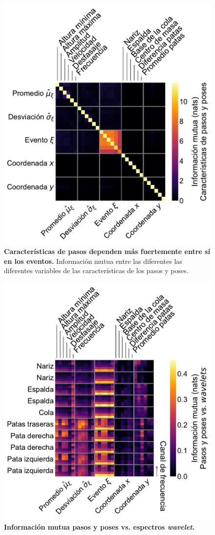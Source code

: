 \begin{appendix}
    \begin{figure}[htbp]
        \centering
        \includegraphics[width=0.7\linewidth]{figuras/capitulo4/mi_scaler_stp.pdf}
        \caption{\textbf{Características de pasos dependen más fuertemente entre sí en los eventos.}
            Información mutua entre las diferentes las diferentes variables de las características de los pasos y poses.}
        \label{fig:capitulo4_mi_scaler_stp}
    \end{figure}

    \begin{figure}[htbp]
        \centering
        \includegraphics[width=0.75\linewidth]{figuras/capitulo4/mi_mean_wav_scaler_stp.pdf}
        \caption{\textbf{Información mutua pasos y poses vs. espectros \textit{wavelet}.}}
        \label{fig:capitulo4_mi_mean_wav_scaler_stp}
    \end{figure}


\end{appendix}
